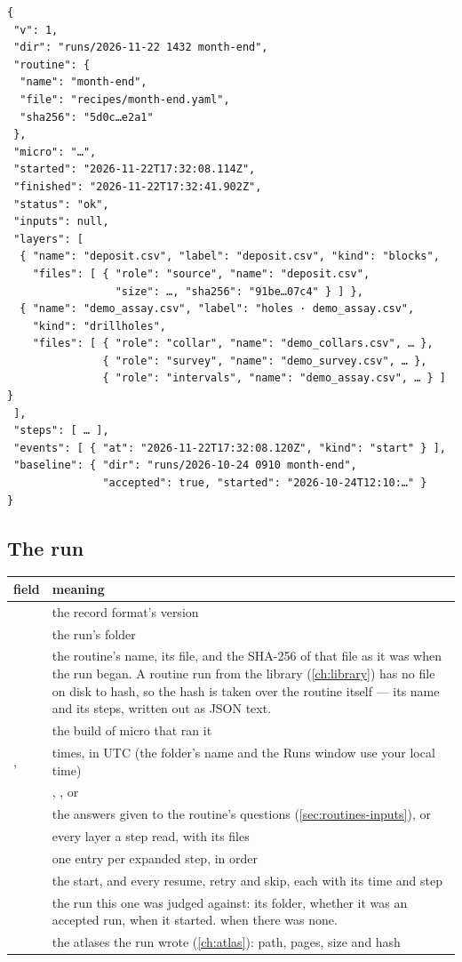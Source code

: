 \begin{lstlisting}
{
 "v": 1,
 "dir": "runs/2026-11-22 1432 month-end",
 "routine": {
  "name": "month-end",
  "file": "recipes/month-end.yaml",
  "sha256": "5d0c…e2a1"
 },
 "micro": "…",
 "started": "2026-11-22T17:32:08.114Z",
 "finished": "2026-11-22T17:32:41.902Z",
 "status": "ok",
 "inputs": null,
 "layers": [
  { "name": "deposit.csv", "label": "deposit.csv", "kind": "blocks",
    "files": [ { "role": "source", "name": "deposit.csv",
                 "size": …, "sha256": "91be…07c4" } ] },
  { "name": "demo_assay.csv", "label": "holes · demo_assay.csv",
    "kind": "drillholes",
    "files": [ { "role": "collar", "name": "demo_collars.csv", … },
               { "role": "survey", "name": "demo_survey.csv", … },
               { "role": "intervals", "name": "demo_assay.csv", … } ] }
 ],
 "steps": [ … ],
 "events": [ { "at": "2026-11-22T17:32:08.120Z", "kind": "start" } ],
 "baseline": { "dir": "runs/2026-10-24 0910 month-end",
               "accepted": true, "started": "2026-10-24T12:10:…" }
}
\end{lstlisting}

\subsection{The run}
\begin{tabularx}{\linewidth}{@{}lL@{}}\toprule
field & meaning \\ \midrule
{} & the record format's version \\
 & the run's folder \\
 & the routine's name, its file, and the SHA-256 of that file as it was when the run began. A routine run from the library (\cref{ch:library}) has no file on disk to hash, so the hash is taken over the routine itself — its name and its steps, written out as JSON text. \\
 & the build of micro that ran it \\
,  & times, in UTC (the folder's name and the Runs window use your local time) \\
 & , ,  or  \\
 & the answers given to the routine's questions (\cref{sec:routines-inputs}), or  \\
 & every layer a step read, with its files \\
 & one entry per expanded step, in order \\
 & the start, and every resume, retry and skip, each with its time and step \\
 & the run this one was judged against: its folder, whether it was an accepted run, when it started.  when there was none. \\
 & the atlases the run wrote (\cref{ch:atlas}): path, pages, size and hash \\
\bottomrule
\end{tabularx}

